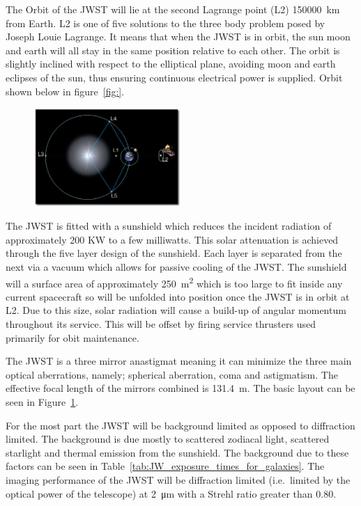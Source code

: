 	The Orbit of the JWST will lie at the second Lagrange point (L2) \SI{150000}{\kilo\metre} from Earth. L2 is one of five solutions to the three body problem posed by Joseph Louie Lagrange. It means that when the JWST is in orbit, the sun moon and earth will all stay in the same position relative to each other. The orbit is slightly inclined with respect to the elliptical plane, avoiding moon and earth eclipses of the sun, thus ensuring continuous electrical power is supplied. Orbit shown below in figure~\ref{fig:}\cite{primary_mirror_construction}.
	\begin{figure}[!htbp]
		\centering
			\includegraphics[width=0.5\textwidth]{../Images/JWST_orbit_L2.jpeg}
		\caption{\cite{jwst_orbit_l2}\label{fig:james_web_layout}}
	\end{figure}

	The JWST is fitted with a sunshield which reduces the incident radiation of approximately 200 KW to a few milliwatts. This solar attenuation is achieved through the five layer design of the sunshield. Each layer is separated from the next via a vacuum which allows for passive cooling of the JWST. The sunshield will a surface area of approximately \SI{250}{\square\metre} which is too large to fit inside any current spacecraft so will be unfolded into position once the JWST is in orbit at L2. Due to this size, solar radiation will cause a build-up of angular momentum throughout its service. This will be offset by firing service thrusters used primarily for obit maintenance.

	The JWST is a three mirror anastigmat meaning it can minimize the three main optical aberrations, namely; spherical aberration, coma and astigmatism. The effective focal length of the mirrors combined is \SI{131.4}{\metre}. The basic layout can be seen in Figure~\ref{fig:james_web_layout}.

	For the most part the JWST will be background limited as opposed to diffraction limited. The background is due mostly to scattered zodiacal light, scattered starlight and thermal emission from the sunshield. The background due to these factors can be seen in Table~\ref{tab:JW_exposure_times_for_galaxies}. The imaging performance of the JWST will be diffraction limited (i.e.\ limited by the optical power of the telescope) at \SI{2}{\micro\metre} with a Strehl ratio greater than 0.80.

